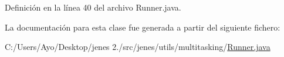 Definición en la línea 40 del archivo Runner.\-java.



La documentación para esta clase fue generada a partir del siguiente fichero\-:\begin{DoxyCompactItemize}
\item 
C\-:/\-Users/\-Ayo/\-Desktop/jenes 2./src/jenes/utils/multitasking/\hyperlink{_runner_8java}{Runner.\-java}\end{DoxyCompactItemize}

